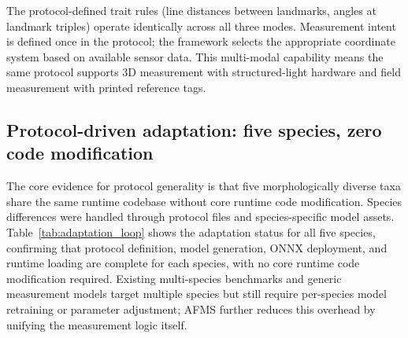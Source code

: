 \documentclass[final,3p,times]{elsarticle}
\begin{document}
The protocol-defined trait rules (line distances between landmarks, angles at landmark triples) operate identically across all three modes. Measurement intent is defined once in the protocol; the framework selects the appropriate coordinate system based on available sensor data. This multi-modal capability means the same protocol supports 3D measurement with structured-light hardware and field measurement with printed reference tags.

\subsection{Protocol-driven adaptation: five species, zero code modification}

The core evidence for protocol generality is that five morphologically diverse taxa share the same runtime codebase without core runtime code modification. Species differences were handled through protocol files and species-specific model assets. Table~\ref{tab:adaptation_loop} shows the adaptation status for all five species, confirming that protocol definition, model generation, ONNX deployment, and runtime loading are complete for each species, with no core runtime code modification required. Existing multi-species benchmarks \citep{liu2024fishphenokey} and generic measurement models \citep{he2024measurement} target multiple species but still require per-species model retraining or parameter adjustment; AFMS further reduces this overhead by unifying the measurement logic itself.

\begin{table}[htbp]
  \centering
  \caption{Protocol-driven species adaptation status. All five species share the same runtime without code modification.}
  \label{tab:adaptation_loop}
  \small
\end{table}
\end{document}
